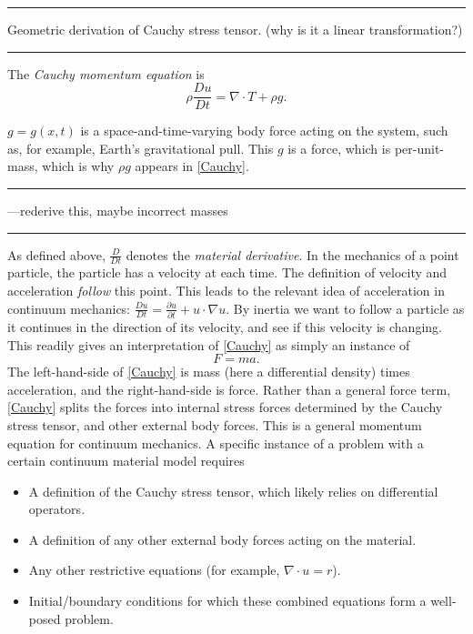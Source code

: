 \documentclass{article}
\newcommand{\todo}[1]{\vskip 0.1in \hrule \vskip 0.03in {#1} \vskip 0.03in \hrule \vskip 0.1in}
\begin{document}
\todo{Geometric derivation of Cauchy stress tensor. (why is it a linear transformation?)}


The \textit{Cauchy momentum equation} is
\begin{equation}\label{Cauchy}
    \rho \frac{Du}{Dt} = \nabla \cdot T + \rho g.
\end{equation}

$g = g(x, t)$ is a space-and-time-varying body force acting
on the system, such as, for example, Earth's gravitational pull.
This $g$ is a force, which is per-unit-mass, which is why
$\rho g$ appears in \eqref{Cauchy}.
\todo{---rederive this, maybe incorrect masses}

As defined above, $\frac{D}{Dt}$ denotes the \textit{material derivative}. In the mechanics of a point particle,
the particle has a velocity at each time. The definition of velocity and acceleration \textit{follow} this point.
This leads to the relevant idea of acceleration in continuum mechanics:
$\frac{Du}{Dt} = \frac{\partial u}{\partial t} + u\cdot \nabla u$.
By inertia we want to follow a particle as it continues in the direction of its velocity, and see if this velocity is changing.
This readily gives an interpretation of \eqref{Cauchy} as simply an instance of
\begin{equation}\label{Newton}
    F = ma.
\end{equation}
The left-hand-side of \eqref{Cauchy} is mass (here a differential density) times acceleration,
and the right-hand-side is force. Rather than a general force term, \eqref{Cauchy} splits the forces into internal stress forces
determined by the Cauchy stress tensor, and other external body forces. This is a general momentum equation for
continuum mechanics. A specific instance of a problem with a certain continuum material model requires
\begin{itemize}
    \item A definition of the Cauchy stress tensor, which likely relies on differential operators.
    \item A definition of any other external body forces acting on the material.
    \item Any other restrictive equations (for example, $\nabla \cdot u = r$).
    \item Initial/boundary conditions for which these combined equations form a well-posed problem.
\end{itemize}
\end{document}

